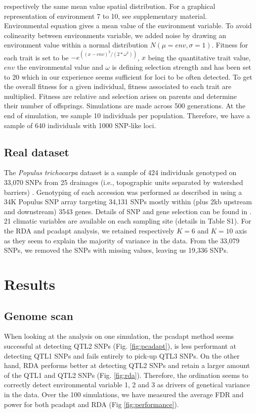 \documentclass[nogrid]{MBE}%
\begin{document}
respectively the same mean value spatial distribution. For a graphical representation of environment 7 to 10, see supplementary material. Environmental equation gives a mean value of the environment variable. To avoid colinearity between environments variable, we added noise by drawing an environment value within a normal distribution $N(\mu=env, \sigma=1)$. Fitness for each trait is set to be $-e^{((x-env)^2/(2*\omega^2))}$, $x$ being the quantitative trait value, $env$ the environmental value and $\omega$ is defining selection strength and has been set to 20 which in our experience seems sufficient for loci to be often detected. To get the overall fitness for a given individual, fitness associated to each trait are multiplied. Fitness are relative and selection arises on parents and determine their number of offsprings. Simulations are made across 500 generations. At the end of simulation, we sample 10 individuals per population. Therefore, we have a sample of 640 individuals with 1000 SNP-like loci.

\subsection{Real dataset}

The \textit{Populus trichocarpa} dataset is a sample of 424 individuals genotyped on 33,070 SNPs from 25 drainages (i.e., topographic units separated by watershed barriers) \citep{Geraldes2014}. Genotyping of each accession was performed as described in \citep{Geraldes2013} using a 34K Populus SNP array targeting 34,131 SNPs mostly within (plus 2kb upstream and downstream) 3543 genes. Details of SNP and gene selection can be found in \citep{Geraldes2013}. 21 climatic variables are available on each sampling site (details in Table S1). For the RDA and pcadapt analysis, we retained respectively $K=6$ and $K=10$ axis as they seem to explain the majority of variance in the data. From the 33,079 SNPs, we removed the SNPs with missing values, leaving us 19,336 SNPs.

\section{Results}

\subsection{Genome scan}

When looking at the analysis on one simulation, the pcadapt method seems successful at detecting QTL2 SNPs (Fig. \ref{fig:pcadapt}), is less performant at detecting QTL1 SNPs and fails entirely to pick-up QTL3 SNPs. On the other hand, RDA performs better at detecting QTL2 SNPs and retain a larger amount of the QTL1 and QTL2 SNPs (Fig. \ref{fig:rda}). Therefore, the ordination seems to correctly detect environmental variable 1, 2 and 3 as drivers of genetical variance in the data. Over the 100 simulations, we have measured the average FDR and power for both pcadapt and RDA (Fig \ref{fig:performance}). 
\end{document}
